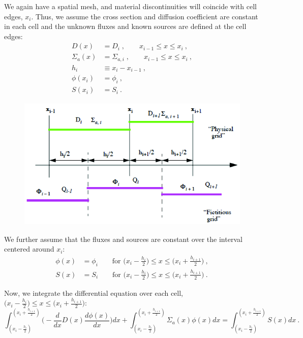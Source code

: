 \documentclass[12pt]{article}
\begin{document}
We again have a spatial mesh, and material discontinuities will coincide with cell edges, $x_i$. Thus, we assume the cross section and diffusion coefficient are constant in each cell and the unknown fluxes and known sources are defined at the cell edges:
\begin{align}
D(x) &= D_i\;, \qquad x_{i-1} \leq x \leq x_i \:,\nonumber \\
\Sigma_a(x) &= \Sigma_{a,i}\;, \qquad x_{i-1} \leq x \leq x_i \:,\nonumber \\
h_i &\equiv x_{i} - x_{i-1} \:,\nonumber \\
\phi(x_i) &= \phi_i \:,\nonumber \\
S(x_i) &= S_i \:.\nonumber 
\end{align}
%
\begin{figure}[h!]
\includegraphics[height=2.5in]{FVM-DE}
\end{figure}

We further assume that the fluxes and sources are constant over the interval centered around $x_i$:
%
\begin{align}
\phi(x) &= \phi_i \qquad \text{for } \bigl(x_i - \frac{h_i}{2}\bigr) \leq x \leq \bigl(x_i + \frac{h_{i+1}}{2}\bigr)\:, \nonumber \\
S(x) &= S_i \qquad \text{for } \bigl(x_i - \frac{h_i}{2}\bigr) \leq x \leq \bigl(x_i + \frac{h_{i+1}}{2}\bigr)\:. \nonumber 
\end{align}

Now, we integrate the differential equation over each cell, $\bigl(x_i - \frac{h_i}{2}\bigr) \leq x \leq \bigl(x_i + \frac{h_{i+1}}{2}\bigr)$:
%
\[\int_{(x_i - \frac{h_i}{2})}^{(x_i + \frac{h_{i+1}}{2})} \biggl(  -\frac{d}{dx}D(x)\frac{d \phi(x)}{dx}\biggr) dx + \int_{(x_i - \frac{h_i}{2})}^{(x_i + \frac{h_{i+1}}{2})} \Sigma_a(x) \phi(x) dx = \int_{(x_i - \frac{h_i}{2})}^{(x_i + \frac{h_{i+1}}{2})} S(x) dx \:.\]
\end{document}
